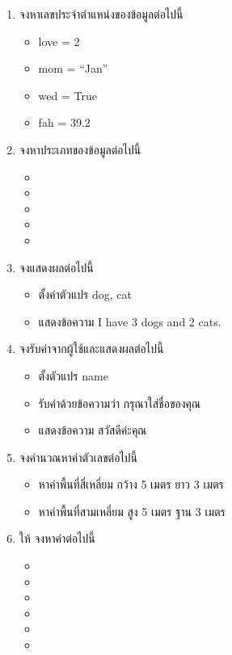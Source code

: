 \begin{enumerate} 
\item จงหาเลขประจำตำแหน่งของข้อมูลต่อไปนี้
\begin{itemize}
\item love = 2
\item mom = “Jan”
\item wed = True
\item fah = 39.2 
\end{itemize}

\item จงหาประเภทของข้อมูลต่อไปนี้
\begin{itemize}
\item {}
\item {}
\item {}
\item {}
\item {}
\end{itemize}

\item จงแสดงผลต่อไปนี้
\begin{itemize}
\item ตั้งค่าตัวแปร dog, cat
\item แสดงข้อความ I have 3 dogs and 2 cats.
\end{itemize}

\item จงรับค่าจากผู้ใช้และแสดงผลต่อไปนี้
\begin{itemize}
\item ตั้งตัวแปร name 
\item รับค่าด้วยข้อความว่า กรุณาใส่ชื่อของคุณ
\item แสดงข้อความ สวัสดีค่ะคุณ
\end{itemize}



\item จงคำนวณหาค่าตัวเลขต่อไปนี้
\begin{itemize}
\item หาค่าพื้นที่สี่เหลี่ยม กว้าง 5 เมตร ยาว 3 เมตร
\item หาค่าพื้นที่สามเหลี่ยม สูง 5 เมตร ฐาน 3 เมตร
\end{itemize}


\item ให้  จงหาค่าต่อไปนี้
\begin{itemize}
\item {}
\item {}
\item {}
\item {}
\item {}
\item {}

\end{itemize}
\end{enumerate}








